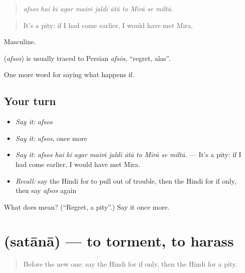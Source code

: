 \begin{quote}
\emph{afsos hai ki agar maiṁ jaldī ātā to Mīrā se miltā.}
\end{quote}

\begin{quote}
It's a pity: if I had come earlier, I would have met Mira.
\end{quote}

Masculine.

\begin{cousinweb}
\textbf{} (\emph{afsos}) is usually traced to Persian \emph{afsōs}, \textquotedblleft{}regret, alas\textquotedblright{}.
\end{cousinweb}

\begin{grammarlens}[title={What you've built}]
One more word for saying what happens if.
\end{grammarlens}

\subsection*{Your turn}
\begin{itemize}
\raggedright
  \item \emph{Say it:} \emph{afsos}
  \item \emph{Say it:} \emph{afsos}, once more
  \item \emph{Say it:} \emph{afsos hai ki agar maiṁ jaldī ātā to Mīrā se miltā.} — It's a pity: if I had come earlier, I would have met Mira.
  \item \emph{Recall:} say the Hindi for to pull out of trouble, then the Hindi for if only, then say \emph{afsos} again
\end{itemize}

\begin{tcolorbox}[breakable,colback=teal!4,colframe=teal!35!black,title={Before you move on}]
What does  mean? (\textquotedblleft{}Regret, a pity\textquotedblright{}.) Say it once more.
\end{tcolorbox}
\section[\texorpdfstring{\hi{सताना} (satānā)}{सताना (satānā)}]{ (satānā) — to torment, to harass}

\label{lesson:HI-C381-satana}



\begin{quote}
Before the new one: say the Hindi for if only, then the Hindi for a pity.
\end{quote}

